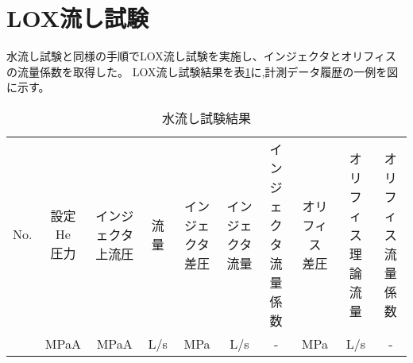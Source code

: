 \section{LOX流し試験}
水流し試験と同様の手順でLOX流し試験を実施し、インジェクタとオリフィスの流量係数を取得した。
LOX流し試験結果を表\ref{tab:LOX}に,計測データ履歴の一例を図に示す。
\begin{table}[htb]
\begin{center}
\caption{水流し試験結果}
\scriptsize
\begin{tabular}{|c|c|c|c|c|c|c|c|c|c|} \hline
No. & \shortstack{設定He\\圧力} & \shortstack{インジェクタ\\上流圧} & 流量 & \shortstack{インジェクタ\\差圧} & \shortstack{インジェクタ\\流量} & \shortstack{インジェクタ\\流量係数} & \shortstack{オリフィス\\差圧} & \shortstack{オリフィス\\理論流量} & \shortstack{オリフィス\\流量係数} \\ \cline{2-10}
 & MPaA & MPaA & L/s & MPa & L/s & - & MPa & L/s & - \\ \hline
\end{tabular}
\label{tab:LOX}
\end{center}
\end{table}
